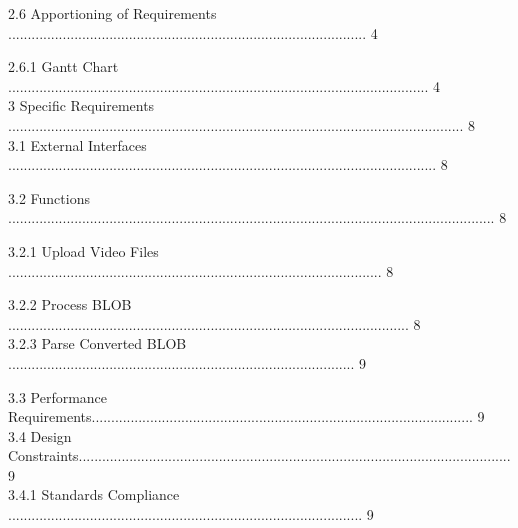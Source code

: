 \documentclass[10pt,draftclsnofoot,onecolumn]{IEEEtran}
\newcommand\tab[1][1cm]{\hspace*{#1}}
\begin{document}
\tab 2.6 Apportioning of Requirements ............................................................................................ 4\\
                 \vspace{5mm}

\tab\tab 2.6.1 Gantt Chart ............................................................................................................ 4\\
                 \vspace{5mm}
3 Specific Requirements ..................................................................................................................... 8\\
                 \vspace{5mm}
\tab 3.1 External Interfaces .............................................................................................................. 8\\
                 \vspace{5mm}
                 
\tab 3.2 Functions ............................................................................................................................. 8\\
                 \vspace{5mm}
                 
\tab \tab 3.2.1 Upload Video Files ................................................................................................ 8\\
                 \vspace{5mm}
                 
\tab \tab 3.2.2 Process BLOB ....................................................................................................... 8\\
                 \vspace{5mm}
\tab \tab 3.2.3 Parse Converted BLOB ......................................................................................... 9\\
                 \vspace{5mm}
                 
\tab 3.3 Performance Requirements.................................................................................................. 9\\
                 \vspace{5mm}
\tab 3.4 Design Constraints............................................................................................................... 9\\
                 \vspace{5mm}
\tab \tab 3.4.1 Standards Compliance ........................................................................................... 9\\
                 \vspace{5mm}
                 
\end{document}
